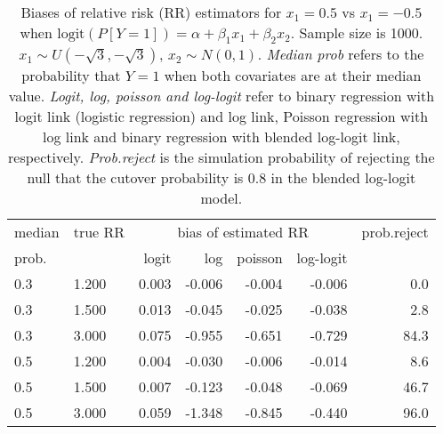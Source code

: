 \documentclass[12pt,a4paper]{article}
\begin{document}
\begin{table}[H] 
\small\sf\centering 
\caption{Biases of relative risk (RR) estimators for $x_1=0.5$ vs $x_1=-0.5$ when $\mbox{logit}(P[Y=1])=\alpha+\beta_1 x_1 + \beta_2 x_2$. Sample size is 1000. $x_1 \sim $$U(-\sqrt{3},-\sqrt{3})$, $x_2 \sim N(0,1)$. {\it Median prob} refers to the probability that $Y=1$ when both covariates are at their median value. {\it Logit, log, poisson and log-logit} refer to binary regression with logit link (logistic regression) and log link, Poisson regression with log link and binary regression with blended log-logit link, respectively. {\it Prob.reject} is the simulation probability of rejecting the null that the cutover probability is $0.8$ in the blended log-logit model.} 
\begin{tabular}{llrrrrr} 
\toprule 
median & true RR & \multicolumn{4}{c}{bias of estimated RR} & prob.reject \\ 
prob. & & logit & log & poisson & log-logit  & \\ \midrule 
0.3 & 1.200 & 0.003 & -0.006 & -0.004 & -0.006 &  0.0 \\  
0.3 & 1.500 & 0.013 & -0.045 & -0.025 & -0.038 &  2.8 \\  
0.3 & 3.000 & 0.075 & -0.955 & -0.651 & -0.729 & 84.3 \\  
0.5 & 1.200 & 0.004 & -0.030 & -0.006 & -0.014 &  8.6 \\  
0.5 & 1.500 & 0.007 & -0.123 & -0.048 & -0.069 & 46.7 \\  
0.5 & 3.000 & 0.059 & -1.348 & -0.845 & -0.440 & 96.0 \\  
\bottomrule 
\end{tabular} 
\end{table} 
\end{document}
